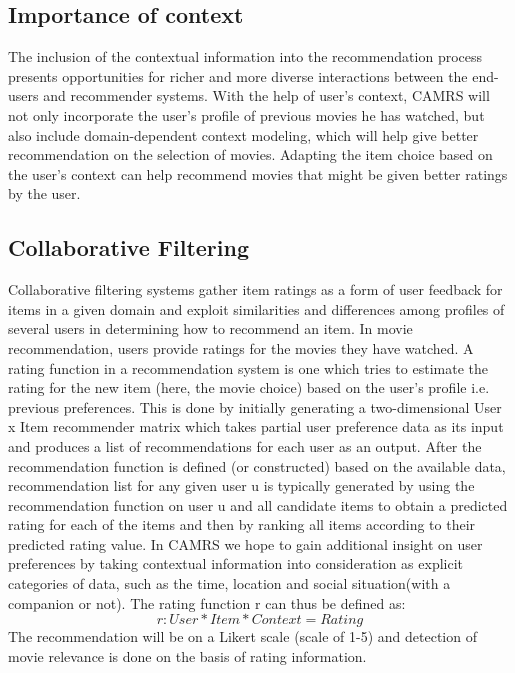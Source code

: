 \documentclass{article}
\begin{document}
\subsection{Importance of context} 
The inclusion of the contextual information into the recommendation process presents opportunities for richer and more diverse interactions between the end-users and recommender systems. With the help of user's context, CAMRS will not only incorporate the user's profile of previous movies he has watched, but also include domain-dependent context modeling, which will help give better recommendation on the selection of movies.  Adapting the item choice based on the user's context can help recommend movies that might be given better ratings by the user.

\subsection{Collaborative Filtering}
Collaborative filtering systems gather item ratings as a form of user feedback for items in a given domain and exploit similarities and differences among profiles of several users in determining how to recommend an item. In movie recommendation, users provide ratings for the movies they have watched. 
A rating function in a recommendation system is one which tries to estimate the rating for the new item (here, the movie choice) based on the user's profile i.e. previous preferences.
This is done by initially generating a two-dimensional User x Item recommender matrix which takes partial user preference data as its input and produces a list of recommendations for each user as an output.
After the recommendation function is defined (or constructed) based on the available data, recommendation list for any given user u is typically generated by using the recommendation function on user u and all candidate items to obtain a predicted rating for each of the items and then by ranking all items according to their predicted rating value.
In CAMRS we hope to gain additional insight on user preferences by taking contextual information into consideration as explicit categories of data, such as the time, location and social situation(with a companion or not). The rating function r can thus be defined as: 
\begin{equation}r: User * Item * Context = Rating 
\end{equation}
The recommendation will be on a Likert scale (scale of 1-5) and detection of movie relevance is done on the basis of rating information. 
\end{document}
